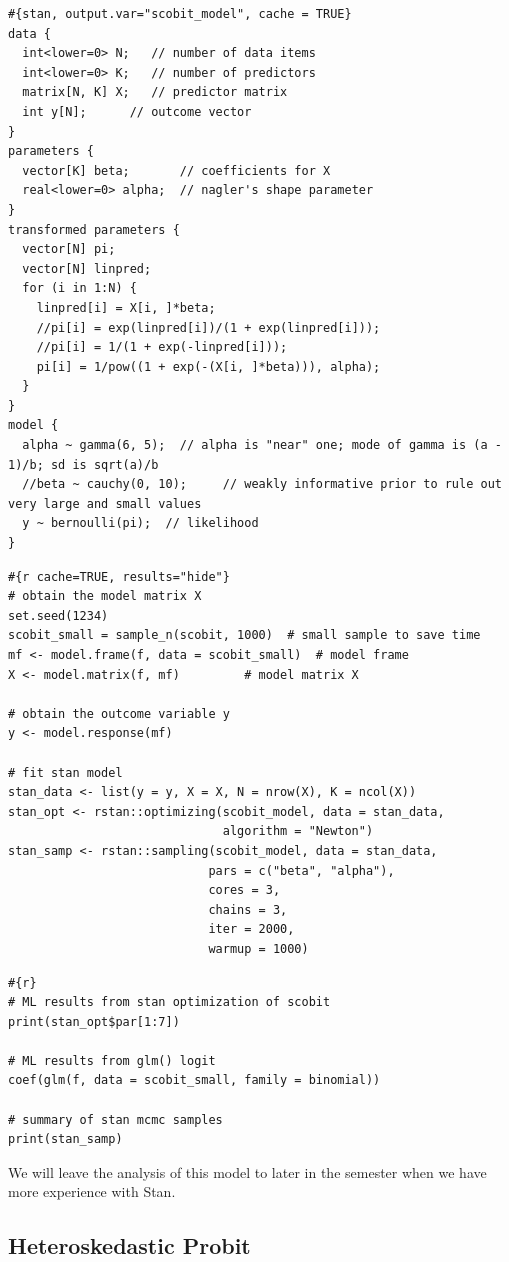 \documentclass[
]{book}
\begin{document}
\begin{verbatim}
#{stan, output.var="scobit_model", cache = TRUE}
data {
  int<lower=0> N;   // number of data items
  int<lower=0> K;   // number of predictors
  matrix[N, K] X;   // predictor matrix
  int y[N];      // outcome vector
}
parameters {
  vector[K] beta;       // coefficients for X
  real<lower=0> alpha;  // nagler's shape parameter
}
transformed parameters {
  vector[N] pi;
  vector[N] linpred;
  for (i in 1:N) {
    linpred[i] = X[i, ]*beta;
    //pi[i] = exp(linpred[i])/(1 + exp(linpred[i]));
    //pi[i] = 1/(1 + exp(-linpred[i])); 
    pi[i] = 1/pow((1 + exp(-(X[i, ]*beta))), alpha);
  }
}
model {
  alpha ~ gamma(6, 5);  // alpha is "near" one; mode of gamma is (a - 1)/b; sd is sqrt(a)/b
  //beta ~ cauchy(0, 10);     // weakly informative prior to rule out very large and small values
  y ~ bernoulli(pi);  // likelihood
}
\end{verbatim}

\begin{verbatim}
#{r cache=TRUE, results="hide"}
# obtain the model matrix X
set.seed(1234)
scobit_small = sample_n(scobit, 1000)  # small sample to save time
mf <- model.frame(f, data = scobit_small)  # model frame
X <- model.matrix(f, mf)         # model matrix X

# obtain the outcome variable y
y <- model.response(mf)

# fit stan model
stan_data <- list(y = y, X = X, N = nrow(X), K = ncol(X))
stan_opt <- rstan::optimizing(scobit_model, data = stan_data, 
                              algorithm = "Newton")
stan_samp <- rstan::sampling(scobit_model, data = stan_data,
                            pars = c("beta", "alpha"),
                            cores = 3,
                            chains = 3,
                            iter = 2000,
                            warmup = 1000)
\end{verbatim}

\begin{verbatim}
#{r}
# ML results from stan optimization of scobit
print(stan_opt$par[1:7])

# ML results from glm() logit 
coef(glm(f, data = scobit_small, family = binomial))

# summary of stan mcmc samples
print(stan_samp)
\end{verbatim}

We will leave the analysis of this model to later in the semester when we have more experience with Stan.

\hypertarget{heteroskedastic-probit}{%
\subsection{Heteroskedastic Probit}\label{heteroskedastic-probit}}
\end{document}
